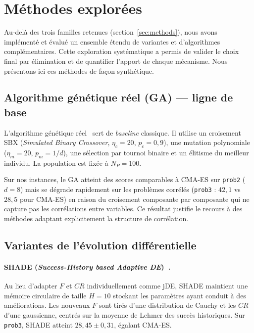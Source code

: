\section{Méthodes explorées}
\label{sec:autres_algorithmes}

Au-delà des trois familles retenues (section~\ref{sec:methods}), nous avons
implémenté et évalué un ensemble étendu de variantes et d'algorithmes
complémentaires.  Cette exploration systématique a permis de valider le choix
final par élimination et de quantifier l'apport de chaque mécanisme.  Nous
présentons ici ces méthodes de façon synthétique.

\subsection{Algorithme génétique réel (GA) — ligne de base}
\label{sec:ga}

L'algorithme génétique réel~\cite{deb2001} sert de \textit{baseline} classique.
Il utilise un croisement SBX (\textit{Simulated Binary Crossover},
$\eta_c = 20$, $p_c = 0{,}9$), une mutation polynomiale ($\eta_m = 20$,
$p_m = 1/d$), une sélection par tournoi binaire et un élitisme du meilleur
individu.  La population est fixée à $N_P = 100$.

Sur nos instances, le GA atteint des scores comparables à CMA-ES sur
\texttt{prob2} ($d=8$) mais se dégrade rapidement sur les problèmes corrélés
(\texttt{prob3} : $42{,}1$ vs $28{,}5$ pour CMA-ES) en raison du croisement
composante par composante qui ne capture pas les corrélations entre variables.
Ce résultat justifie le recours à des méthodes adaptant explicitement la
structure de corrélation.

\subsection{Variantes de l'évolution différentielle}

\paragraph{SHADE (\textit{Success-History based Adaptive DE})~\cite{tanabe2013}.}
Au lieu d'adapter $F$ et $CR$ individuellement comme jDE, SHADE maintient une
mémoire circulaire de taille $H = 10$ stockant les paramètres ayant conduit à
des améliorations.  Les nouveaux $F$ sont tirés d'une distribution de Cauchy et
les $CR$ d'une gaussienne, centrés sur la moyenne de Lehmer des succès
historiques.  Sur \texttt{prob3}, SHADE atteint $28{,}45 \pm 0{,}31$, égalant
CMA-ES.

